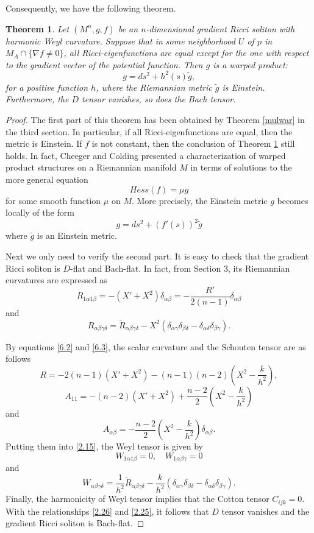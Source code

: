 \documentclass{amsart}
\newtheorem{theorem}{Theorem}[section]
\theoremstyle{definition}
\theoremstyle{remark}
\numberwithin{equation}{section}
\begin{document}
	Consequently, we have the following theorem.
	\begin{theorem} \label{same}
	Let $(M^n, g,f)$ be an $n$-dimensional gradient Ricci soliton 
	with harmonic Weyl curvature. 	
	Suppose  that in some neighborhood $U$ of $p$ in $M_A \cap \{ \nabla f \neq 0  \}$, 
    all Ricci-eigenfunctions are equal except for the one with respect to the gradient vector of the potential function.
	Then $g$ is a warped product:
		\begin{equation} \label{metr}
		g= ds^2 +  h^2(s) \tilde{g},
		\end{equation}
		for a positive function $h$,
		where the Riemannian metric $\tilde{g}$ is Einstein. 
		Furthermore, the $D$ tensor vanishes, so does the Bach tensor. 
	\end{theorem}
	
	
	\begin{proof}
		The first part of this theorem has been obtained by Theorem \ref{mulwar} in the third section.
		In particular, if all Ricci-eigenfunctions are equal, then the metric is Einstein. 
		If $f$ is not constant, then the conclusion of Theorem \ref{same} still holds.  
		In fact,  Cheeger and Colding \cite{CC} presented a
		characterization of warped product structures on a Riemannian manifold $M$ in terms
		of solutions to the more general equation
		\[
		Hess(f)=\mu g
		\]
		for some smooth function $\mu$ on $M$. 
		More precisely, the Einstein metric $g$ becomes locally of the form 
		\[
		g= ds^2 + (f'(s))^2 \tilde{g}
		\]
		where $\tilde{g}$ is an Einstein metric. 
		
		Next we only need to verify the second part.
		It is easy to check that the gradient Ricci soliton is $D$-flat and Bach-flat. 
		In fact, from Section 3, its Riemannian curvatures are expressed as
		\[
		R_{1\alpha 1\beta}=-\left( X'+X^2\right)\delta_{\alpha\beta}=-\frac{R'}{2(n-1)}\delta_{\alpha\beta}
		\]
		and 
		\[
		R_{\alpha\beta\gamma\delta}
		=\tilde {R}_{\alpha\beta\gamma\delta}-
		X^2\left( \delta_{\alpha\gamma}\delta_{\beta\delta}-\delta_{\alpha\delta}\delta_{\beta\gamma}\right).
		\]
		
		By equations \eqref{6.2} and \eqref{6.3}, the scalar curvature and the Schouten tensor are as follows
		\[
		R=-2(n-1)\left( X'+X^2\right)-(n-1)(n-2)\left(X^2-\frac{k}{h^2} \right),
		\]
		\[
		A_{11}=-(n-2)\left( X'+X^2\right)+\frac{n-2}{2}\left(X^2-\frac{k}{h^2} \right)
		\]
		and 
		\[
		A_{\alpha\beta}=-\frac{n-2}{2}\left(X^2-\frac{k}{h^2}\right)\delta_{\alpha\beta}.
		\]
		Putting them into \eqref{2.15}, the Weyl tensor is given by
		\[
		W_{1\alpha1\beta}=0, \quad W_{1\alpha\beta\gamma}=0
		\]
		and
		\[
		W_{\alpha\beta\gamma\delta}
		=\frac{1}{h^2}\tilde {R}_{\alpha\beta\gamma\delta}-
		\frac{k}{h^2}\left( \delta_{\alpha\gamma}\delta_{\beta\delta}-\delta_{\alpha\delta}\delta_{\beta\gamma}\right).
		\]
		Finally, the harmonicity of Weyl tensor implies that the Cotton tensor $C_{ijk}=0$.
		With the relationships \eqref{2.26} and \eqref{2.25},
		it follows that $D$ tensor vanishes and the gradient Ricci soliton is Bach-flat. 
	\end{proof}
	
\end{document}
